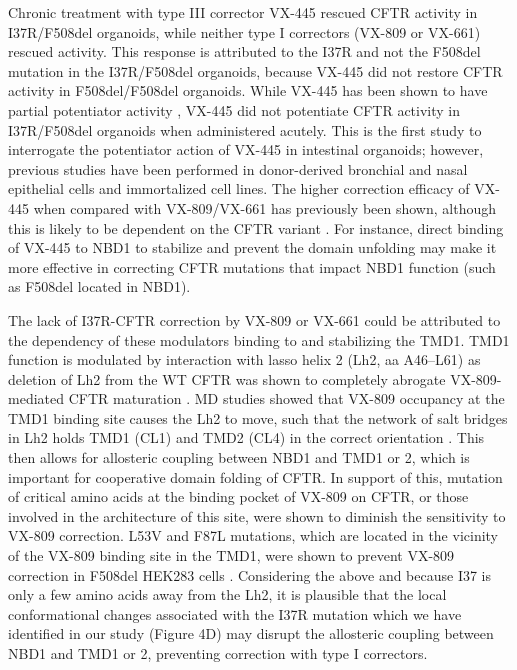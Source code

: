 Chronic treatment with type III corrector VX-445 rescued CFTR activity in I37R/F508del organoids, while neither type I correctors (VX-809 or VX-661) rescued activity. This response is attributed to the I37R and not the F508del mutation in the I37R/F508del organoids, because VX-445 did not restore CFTR activity in F508del/F508del organoids. While VX-445 has been shown to have partial potentiator activity \cite{laselva2021,shaughnessy2021, veit2021}, VX-445 did not potentiate CFTR activity in I37R/F508del organoids when administered acutely. This is the first study to interrogate the potentiator action of VX-445 in intestinal organoids; however, previous studies have been performed in donor-derived bronchial and nasal epithelial cells and immortalized cell lines. The higher correction efficacy of VX-445 when compared with VX-809/VX-661 has previously been shown, although this is likely to be dependent on the CFTR variant \cite{keating2018,veit2020a, veit2021a}. For instance, direct binding of VX-445 to NBD1 to stabilize and prevent the domain unfolding may make it more effective in correcting CFTR mutations that impact NBD1 function (such as F508del located in NBD1).

The lack of I37R-CFTR correction by VX-809 or VX-661 could be attributed to the dependency of these modulators binding to and stabilizing the TMD1. TMD1 function is modulated by interaction with lasso helix 2 (Lh2, aa A46–L61) as deletion of Lh2 from the WT CFTR was shown to completely abrogate VX-809-mediated CFTR maturation \cite{sabusap2021}. MD studies showed that VX-809 occupancy at the TMD1 binding site causes the Lh2 to move, such that the network of salt bridges in Lh2 holds TMD1 (CL1) and TMD2 (CL4) in the correct orientation \cite{baatallah2021, okiyoneda2013}. This then allows for allosteric coupling between NBD1 and TMD1 or 2, which is important for cooperative domain folding of CFTR. In support of this, mutation of critical amino acids at the binding pocket of VX-809 on CFTR, or those involved in the architecture of this site, were shown to diminish the sensitivity to VX-809 correction. L53V and F87L mutations, which are located in the vicinity of the VX-809 binding site in the TMD1, were shown to prevent VX-809 correction in F508del HEK283 cells \cite{baatallah2021}. Considering the above and because I37 is only a few amino acids away from the Lh2, it is plausible that the local conformational changes associated with the I37R mutation which we have identified in our study (Figure 4D) may disrupt the allosteric coupling between NBD1 and TMD1 or 2, preventing correction with type I correctors.

